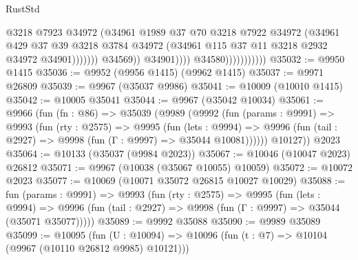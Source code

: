 \begin{lexlean}{RustStd}
\begin{coremodule}
                                              @3218
                                              @7923
                                              @34972
                                              (@34961
                                                @1989
                                                @37
                                                @70
                                                @3218
                                                @7922
                                                @34972
                                                (@34961
                                                  @429
                                                  @37
                                                  @39
                                                  @3218
                                                  @3784
                                                  @34972
                                                  (@34961
                                                    @115
                                                    @37
                                                    @11
                                                    @3218
                                                    @2932
                                                    @34972
                                                    @34901)))))))
                                      @34569))
                                  @34901))))
                          @34580)))))))))))
@35032 := @9950 @1415
@35036 := @9952 (@9956 @1415) (@9962 @1415)
@35037 := @9971 @26809
@35039 := @9967 (@35037 @9986)
@35041 := @10009 (@10010 @1415)
@35042 := @10005 @35041
@35044 := @9967 (@35042 @10034)
@35061 := @9966
    (fun (fn : @86) =>
    @35039
      (@9989
        (@9992
          (fun (params : @9991) =>
          @9993
            (fun (rty : @2575) =>
            @9995
              (fun (lets : @9994) =>
              @9996 (fun (tail : @2927) => @9998 (fun (Γ : @9997) => @35044 @10081))))))
        @10127))
    @2023
@35064 := @10133 (@35037 (@9984 @2023))
@35067 := @10046 (@10047 @2023) @26812
@35071 := @9967 (@10038 (@35067 @10055) @10059)
@35072 := @10072 @2023
@35077 := @10069 (@10071 @35072 @26815 @10027 @10029)
@35088 := fun (params : @9991) =>
  @9993
    (fun (rty : @2575) =>
    @9995
      (fun (lets : @9994) =>
      @9996 (fun (tail : @2927) => @9998 (fun (Γ : @9997) => @35044 (@35071 @35077)))))
@35089 := @9992 @35088
@35090 := @9989 @35089
@35099 := @10095
    (fun (U : @10094) => @10096 (fun (t : @7) => @10104 (@9967 (@10110 @26812 @9985) @10121)))

\end{coremodule}
\end{lexlean}

